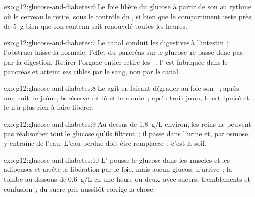 \begin{solution}{exo:g12:glucose-and-diabetes:6}
Le foie libère du glucose à partir de son  au rythme où le
cerveau le retire, sous le contrôle du , si bien que le
compartiment reste près de \qty{5}{g} bien que son contenu soit
renouvelé toutes les heures.
\end{solution}

\begin{solution}{exo:g12:glucose-and-diabetes:7}
Le canal conduit les  digestives à l'intestin~; l'obstruer
laisse la  normale, l'effet du pancréas sur le glucose ne
passe donc pas par la digestion. Retirer l'organe entier retire les
~: l' est fabriquée dans le pancréas et atteint ses
cibles par le sang, non par le canal.
\end{solution}

\begin{solution}{exo:g12:glucose-and-diabetes:8}
Le  agit en faisant dégrader au foie son ~; après une
nuit de jeûne, la réserve est là et la  monte~; après trois
jours, le  est épuisé et le  n'a plus rien à faire
libérer.
\end{solution}

\begin{solution}{exo:g12:glucose-and-diabetes:9}
Au-dessus de \qty{1.8}{g/L} environ, les reins ne peuvent pas
réabsorber tout le glucose qu'ils filtrent~; il passe dans l'urine et,
par osmose, y entraîne de l'eau. L'eau perdue doit être remplacée~:
c'est la soif.
\end{solution}

\begin{solution}{exo:g12:glucose-and-diabetes:10}
L' pousse le glucose dans les muscles et les 
adipeuses et arrête la libération par le foie, mais aucun glucose
n'arrive~: la  tombe au-dessous de \qty{0.6}{g/L} en une heure
ou deux, avec sueurs, tremblements et confusion~; du sucre pris
aussitôt corrige la chose.
\end{solution}

